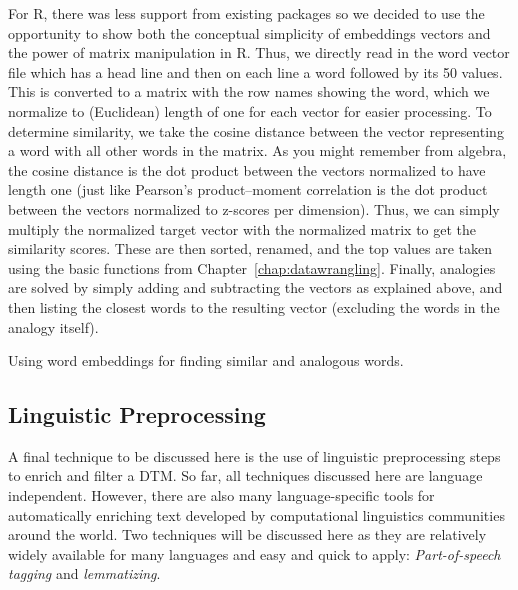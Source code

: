 For R, there was less support from existing packages so we decided to use the opportunity to show both the conceptual simplicity of embeddings vectors and the power of matrix manipulation in R.
Thus, we directly read in the word vector file which has a head line and then on each line a word followed by its 50 values.
This is converted to a matrix with the row names showing the word,
which we normalize to (Euclidean) length of one for each vector for easier processing.
To determine similarity, we take the cosine distance between the vector representing a word with all other words in the matrix.
As you might remember from algebra, the cosine distance is the dot product between the vectors normalized to have length one
(just like Pearson's product--moment correlation is the dot product between the vectors normalized to z-scores per dimension).
Thus, we can simply multiply the normalized target vector with the normalized matrix to get the similarity scores.
These are then sorted, renamed, and the top values are taken using the basic functions from Chapter~\ref{chap:datawrangling}.
Finally, analogies are solved by simply adding and subtracting the vectors as explained above, and then listing the closest words to the resulting vector
(excluding the words in the analogy itself).

\begin{ccsexample}
\caption{Using word embeddings for finding similar and analogous words.}\label{ex:embedding}
\end{ccsexample}





\subsection{Linguistic Preprocessing} \label{sec:nlp}

A final technique to be discussed here is the use of linguistic preprocessing steps to enrich and filter a DTM.
So far, all techniques discussed here are language independent.
However, there are also many language-specific tools for automatically enriching text developed by computational linguistics communities around the world.
Two techniques will be discussed here as they are relatively widely available for many languages and easy and quick to apply: \emph{Part-of-speech tagging} and \emph{lemmatizing}.

